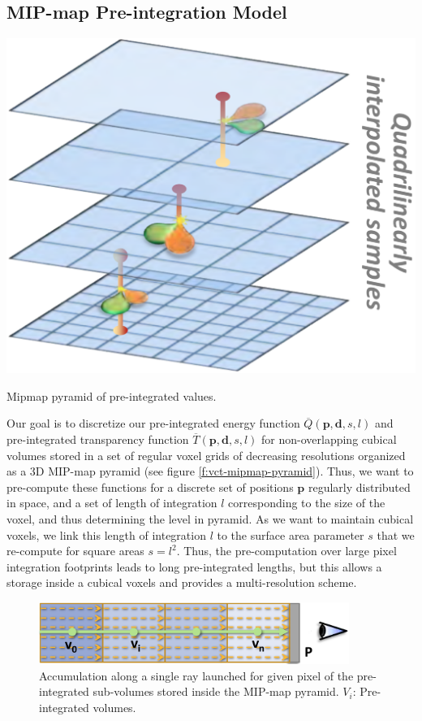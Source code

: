 \subsection{MIP-map Pre-integration Model}\label{sec:mip-map-pre-integration-model}
\begin{marginfigure}
	\includegraphics{graphics/vct/vct-7-6}
	\caption{Mipmap pyramid of pre-integrated values.}
	\label{f:vct-mipmap-pyramid}
\end{marginfigure}

Our goal is to discretize our pre-integrated energy function $\overline{Q}(\mathbf{p},\mathbf{d},s,l)$ and pre-integrated transparency function $\overline{T}(\mathbf{p},\mathbf{d},s,l)$ for non-overlapping cubical volumes stored in a set of regular voxel grids of decreasing resolutions organized as a 3D MIP-map pyramid (see figure \ref{f:vct-mipmap-pyramid}). Thus, we want to pre-compute these functions for a discrete set of positions $\mathbf{p}$ regularly distributed in space, and a set of length of integration $l$ corresponding to the size of the voxel, and thus determining the level in pyramid. As we want to maintain cubical voxels, we link this length of integration $l$ to the surface area parameter $s$ that we re-compute for square areas $s=l^{2}$. Thus, the pre-computation over large pixel integration footprints leads to long pre-integrated lengths, but this allows a storage inside a cubical voxels and provides a multi-resolution scheme.

\begin{figure}\label{f:vct-pre-integration-3}
	\begin{center}
		\includegraphics[width=0.9\textwidth]{graphics/vct/vct-7-3}
	\end{center}
	\caption{Accumulation along a single ray launched for given pixel of the pre-integrated sub-volumes stored inside the MIP-map pyramid. $V_i$: Pre-integrated volumes.}
\end{figure}


